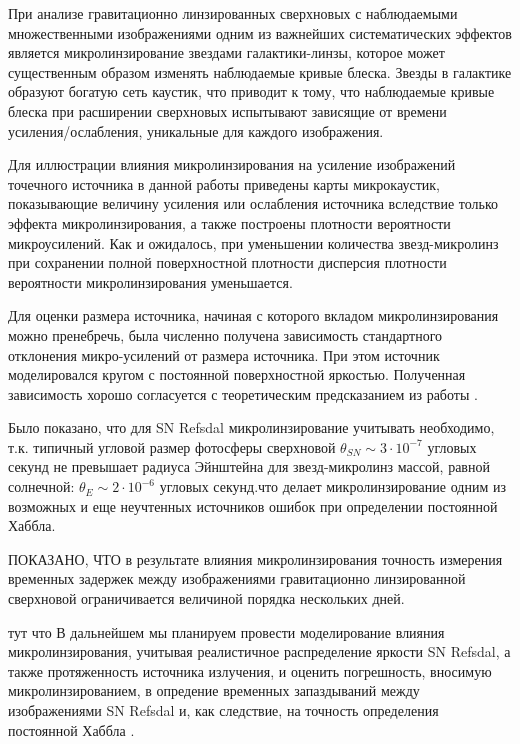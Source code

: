 При анализе гравитационно линзированных сверхновых с наблюдаемыми множественными изображениями одним из важнейших систематических эффектов является микролинзирование звездами галактики-линзы, которое может существенным образом изменять наблюдаемые кривые блеска. Звезды в галактике образуют богатую сеть каустик, что приводит к тому, что наблюдаемые кривые блеска при расширении сверхновых испытывают зависящие от времени усиления/ослабления, уникальные для каждого изображения.

Для иллюстрации влияния микролинзирования на усиление изображений точечного источника в данной работы приведены карты микрокаустик, показывающие величину усиления или ослабления источника вследствие только эффекта микролинзирования, а также построены плотности вероятности микроусилений. Как и ожидалось, при уменьшении количества звезд-микролинз при сохранении полной поверхностной плотности дисперсия плотности вероятности микролинзирования уменьшается.

Для оценки размера источника, начиная с которого вкладом микролинзирования можно пренебречь, была численно получена зависимость стандартного отклонения микро-усилений от размера источника. При этом источник моделировался кругом с постоянной поверхностной яркостью. Полученная зависимость хорошо согласуется с теоретическим предсказанием из работы \cite{refsdalstabell1991}. 

Было показано, что для SN Refsdal микролинзирование учитывать необходимо, т.к. типичный угловой размер фотосферы сверхновой $\theta_{SN} \sim 3 \cdot 10^{-7}$ угловых секунд не превышает радиуса Эйнштейна для звезд-микролинз массой, равной солнечной: $\theta_E \sim 2 \cdot 10^{-6}$ угловых секунд.что делает микролинзирование одним из возможных и еще неучтенных источников ошибок при определении постоянной Хаббла.

ПОКАЗАНО, ЧТО в результате влияния микролинзирования точность измерения временных задержек между изображениями гравитационно линзированной сверхновой ограничивается величиной порядка нескольких дней.

тут что
В дальнейшем мы планируем провести моделирование влияния микролинзирования, учитывая реалистичное распределение яркости SN Refsdal, а также протяженность источника излучения, и оценить погрешность, вносимую микролинзированием, в опредение временных запаздываний между изображениями SN Refsdal и, как следствие, на точность определения постоянной Хаббла .
